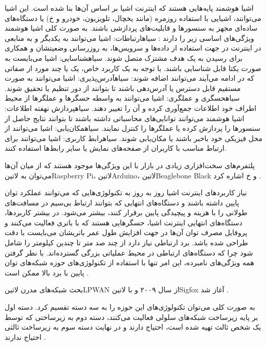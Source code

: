 اشیا هوشمند پایه‌هایی هستند که اینترنت اشیا بر اساس آن‌ها بنا شده است. این اشیا می‌توانند، اشیایی با استفاده روزمره (مانند یخچال، تلویزیون، خودرو و ‌خ) یا دستگاه‌های ساده‌ای مجهز به
سنسورها و قابلیت‌های پردازشی باشند. به صورت کلی اشیا هوشمند ویژگی‌های اساسی زیر را دارند
:
 ‌سیاه{ارتباطات}: اشیا می‌توانند به یکدیگر و به منابعی در اینترنت در جهت استفاده از داده‌ها و سرویس‌ها، به روزرسانی وضعیتشان و همکاری برای رسیدن به یک هدف مشترک متصل شوند.
 ‌سیاه{شناسایی}: اشیا می‌بایست به صورت یکتا قابل شناسایی باشند.
با توجه به یک کاربرد خاص، یک یا چند مورد از صفاتی که در ادامه می‌آیند می‌توانند اضافه شوند:
 ‌سیاه{آدرس‌پذیری}: اشیا می‌توانند به صورت مستقیم قابل دسترس یا آدرس‌دهی باشند تا بتوانند از دور تنظیم یا تحقیق شوند.
 ‌سیاه{حسگری و عملگری}: اشیا می‌توانند به واسطه حسگرها و عملگرها از محیط اطراف خود اطلاعات جمع‌آوری کرده و آن را تغییر دهند.
 ‌سیاه{پردازش نهفته اطلاعات}: اشیا هوشمند می‌توانند توانایی‌های محاسباتی داشته باشند تا بتوانند نتایج حاصل از سنسورها را پردازش کرده یا عملگرها را کنترل نمایند.
 ‌سیاه{مکان‌یابی}: اشیا می‌توانند از محل فیزیکی خود باخبر باشند یا مکان‌یابی شوند.
 ‌سیاه{رابط کاربری}: اشیا می‌توانند برای ارتباط مناسب با کاربران از صفحه‌های نمایش یا سایر رابط‌ها استفاده کنند.

پلتفرم‌های سخت‌افزاری زیادی در بازار با این ویژگی‌ها موجود هستند که از میان آن‌ها می‌توان به ‌لاتین{Raspberry Pi}، ‌لاتین{Arduino}، ‌لاتین{Beaglebone Black} و ‌خ اشاره کرد
.


نیاز کاربردهای اینترنت اشیا روز به روز به تکنولوژی‌هایی که می‌توانند عملکرد توان پایین داشته باشند
و دستگاه‌های انتهایی که بتوانند ارتباط بی‌سیم در مسافت‌های طولانی را با هزینه و پیچیدگی پایین برقرار کنند، بیشتر می‌شود.
در بیشتر کاربردها، دستگاه‌های انتهایی اینترنت اشیا، حسگرهایی هستند که با باتری فعالیت می‌کنند و پروفایل مصرف توان آن‌ها در جهت افزایش طول عمر
باتریشان می‌بایست با دقت طراحی شده باشد.
برد ارتباطی نیاز دارد از چند صد متر تا چندین کیلومتر را شامل شود چرا که دستگاه‌های ارتباطی در محیط عملیاتی بزرگی گسترده‌اند.
با نظر گرفتن همه ویژگی‌های نامبرده، این امر تنها با استفاده از تکنولوژی‌های حوزه شبکه‌های توان پایین با برد بالا ممکن است
.

بحث شبکه‌های مدرن ‌لاتین{LPWAN} از سال ۲۰۰۹ و با ‌لاتین{Sigfox} آغاز شد .

به صورت کلی می‌توان تکنولوژی‌های این حوزه را به سه دسته تقسیم کرد. دسته اول بر پایه زیرساخت شبکه‌های سلولی فعالیت می‌کنند،
دسته دوم به زیرساختی که توسط یک شخص ثالث تهیه شده است، احتیاج دارند و در نهایت دسته سوم به زیرساخت ثالثی احتیاج ندارند
.

